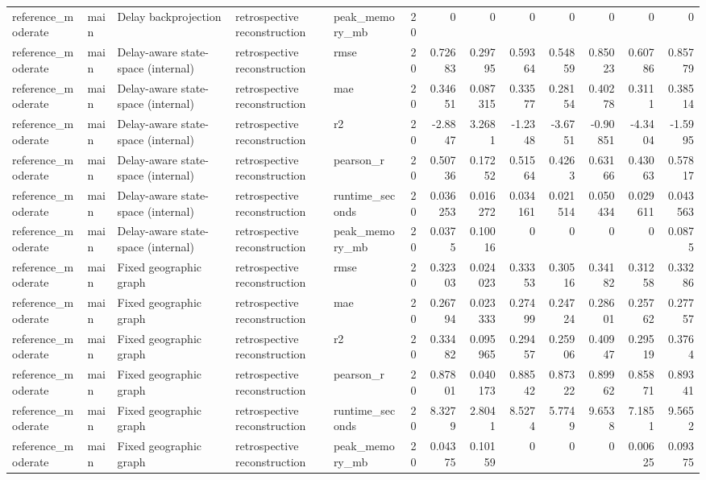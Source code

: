 \begin{table}[!htbp]
{{\begin{tabular}{lllllrrrrrrrr}
reference_moderate & main & Delay backprojection & retrospective reconstruction & peak_memory_mb & 20 & 0 & 0 & 0 & 0 & 0 & 0 & 0 \\
reference_moderate & main & Delay-aware state-space (internal) & retrospective reconstruction & rmse & 20 & 0.72683 & 0.29795 & 0.59364 & 0.54859 & 0.85023 & 0.60786 & 0.85779 \\
reference_moderate & main & Delay-aware state-space (internal) & retrospective reconstruction & mae & 20 & 0.34651 & 0.087315 & 0.33577 & 0.28154 & 0.40278 & 0.3111 & 0.38514 \\
reference_moderate & main & Delay-aware state-space (internal) & retrospective reconstruction & r2 & 20 & -2.8847 & 3.2681 & -1.2348 & -3.6751 & -0.90851 & -4.3404 & -1.5995 \\
reference_moderate & main & Delay-aware state-space (internal) & retrospective reconstruction & pearson_r & 20 & 0.50736 & 0.17252 & 0.51564 & 0.4263 & 0.63166 & 0.43063 & 0.57817 \\
reference_moderate & main & Delay-aware state-space (internal) & retrospective reconstruction & runtime_seconds & 20 & 0.036253 & 0.016272 & 0.034161 & 0.021514 & 0.050434 & 0.029611 & 0.043563 \\
reference_moderate & main & Delay-aware state-space (internal) & retrospective reconstruction & peak_memory_mb & 20 & 0.0375 & 0.10016 & 0 & 0 & 0 & 0 & 0.0875 \\
reference_moderate & main & Fixed geographic graph & retrospective reconstruction & rmse & 20 & 0.32303 & 0.024023 & 0.33353 & 0.30516 & 0.34182 & 0.31258 & 0.33286 \\
reference_moderate & main & Fixed geographic graph & retrospective reconstruction & mae & 20 & 0.26794 & 0.023333 & 0.27499 & 0.24724 & 0.28601 & 0.25762 & 0.27757 \\
reference_moderate & main & Fixed geographic graph & retrospective reconstruction & r2 & 20 & 0.33482 & 0.095965 & 0.29457 & 0.25906 & 0.40947 & 0.29519 & 0.3764 \\
reference_moderate & main & Fixed geographic graph & retrospective reconstruction & pearson_r & 20 & 0.87801 & 0.040173 & 0.88542 & 0.87322 & 0.89962 & 0.85871 & 0.89341 \\
reference_moderate & main & Fixed geographic graph & retrospective reconstruction & runtime_seconds & 20 & 8.3279 & 2.8041 & 8.5274 & 5.7749 & 9.6538 & 7.1851 & 9.5652 \\
reference_moderate & main & Fixed geographic graph & retrospective reconstruction & peak_memory_mb & 20 & 0.04375 & 0.10159 & 0 & 0 & 0 & 0.00625 & 0.09375 \\

\end{tabular}}}
\end{table}
